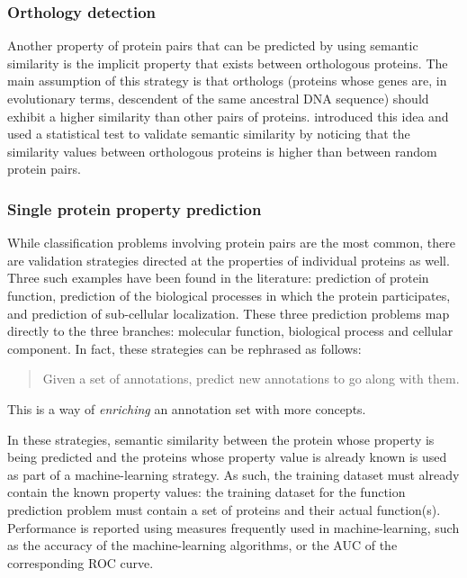 \subsubsection{Orthology detection}

Another property of protein pairs that can be predicted by using semantic similarity is the implicit property that exists between orthologous proteins. The main assumption of this strategy is that orthologs (\ie proteins whose genes are, in evolutionary terms, descendent of the same ancestral DNA sequence) should exhibit a higher similarity than other pairs of proteins. \citet{Wu2013} introduced this idea and used a statistical test to validate semantic similarity by noticing that the similarity values between orthologous proteins is higher than between random protein pairs.


\subsubsection{Single protein property prediction}

While classification problems involving protein pairs are the most common, there are validation strategies directed at the properties of individual proteins as well. Three such examples have been found in the literature: prediction of protein function, prediction of the biological processes in which the protein participates, and prediction of sub-cellular localization. These three prediction problems map directly to the three  branches: molecular function, biological process and cellular component. In fact, these strategies can be rephrased as follows:
\begin{quote}
    Given a set of  annotations, predict new annotations to go along with them.
\end{quote}
This is a way of \emph{enriching} an annotation set with more concepts.

In these strategies, semantic similarity between the protein whose property is being predicted and the proteins whose property value is already known is used as part of a machine-learning strategy. As such, the training dataset must already contain the known property values: \eg the training dataset for the function prediction problem must contain a set of proteins and their actual function(s). Performance is reported using measures frequently used in machine-learning, such as the accuracy of the machine-learning algorithms, or the AUC of the corresponding ROC curve.


